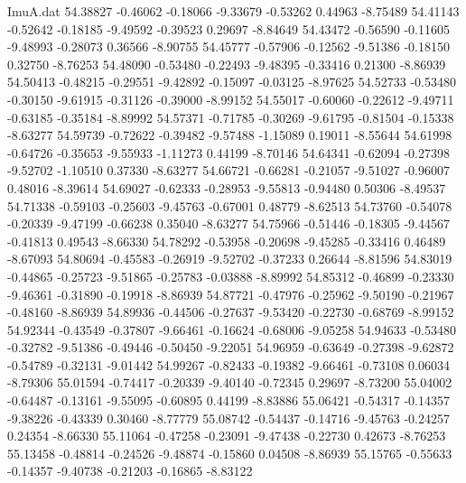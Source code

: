 \begin{filecontents}{ImuA.dat}
  54.38827   -0.46062   -0.18066   -9.33679   -0.53262    0.44963   -8.75489
  54.41143   -0.52642   -0.18185   -9.49592   -0.39523    0.29697   -8.84649
  54.43472   -0.56590   -0.11605   -9.48993   -0.28073    0.36566   -8.90755
  54.45777   -0.57906   -0.12562   -9.51386   -0.18150    0.32750   -8.76253
  54.48090   -0.53480   -0.22493   -9.48395   -0.33416    0.21300   -8.86939
  54.50413   -0.48215   -0.29551   -9.42892   -0.15097   -0.03125   -8.97625
  54.52733   -0.53480   -0.30150   -9.61915   -0.31126   -0.39000   -8.99152
  54.55017   -0.60060   -0.22612   -9.49711   -0.63185   -0.35184   -8.89992
  54.57371   -0.71785   -0.30269   -9.61795   -0.81504   -0.15338   -8.63277
  54.59739   -0.72622   -0.39482   -9.57488   -1.15089    0.19011   -8.55644
  54.61998   -0.64726   -0.35653   -9.55933   -1.11273    0.44199   -8.70146
  54.64341   -0.62094   -0.27398   -9.52702   -1.10510    0.37330   -8.63277
  54.66721   -0.66281   -0.21057   -9.51027   -0.96007    0.48016   -8.39614
  54.69027   -0.62333   -0.28953   -9.55813   -0.94480    0.50306   -8.49537
  54.71338   -0.59103   -0.25603   -9.45763   -0.67001    0.48779   -8.62513
  54.73760   -0.54078   -0.20339   -9.47199   -0.66238    0.35040   -8.63277
  54.75966   -0.51446   -0.18305   -9.44567   -0.41813    0.49543   -8.66330
  54.78292   -0.53958   -0.20698   -9.45285   -0.33416    0.46489   -8.67093
  54.80694   -0.45583   -0.26919   -9.52702   -0.37233    0.26644   -8.81596
  54.83019   -0.44865   -0.25723   -9.51865   -0.25783   -0.03888   -8.89992
  54.85312   -0.46899   -0.23330   -9.46361   -0.31890   -0.19918   -8.86939
  54.87721   -0.47976   -0.25962   -9.50190   -0.21967   -0.48160   -8.86939
  54.89936   -0.44506   -0.27637   -9.53420   -0.22730   -0.68769   -8.99152
  54.92344   -0.43549   -0.37807   -9.66461   -0.16624   -0.68006   -9.05258
  54.94633   -0.53480   -0.32782   -9.51386   -0.49446   -0.50450   -9.22051
  54.96959   -0.63649   -0.27398   -9.62872   -0.54789   -0.32131   -9.01442
  54.99267   -0.82433   -0.19382   -9.66461   -0.73108    0.06034   -8.79306
  55.01594   -0.74417   -0.20339   -9.40140   -0.72345    0.29697   -8.73200
  55.04002   -0.64487   -0.13161   -9.55095   -0.60895    0.44199   -8.83886
  55.06421   -0.54317   -0.14357   -9.38226   -0.43339    0.30460   -8.77779
  55.08742   -0.54437   -0.14716   -9.45763   -0.24257    0.24354   -8.66330
  55.11064   -0.47258   -0.23091   -9.47438   -0.22730    0.42673   -8.76253
  55.13458   -0.48814   -0.24526   -9.48874   -0.15860    0.04508   -8.86939
  55.15765   -0.55633   -0.14357   -9.40738   -0.21203   -0.16865   -8.83122

\end{filecontents}
